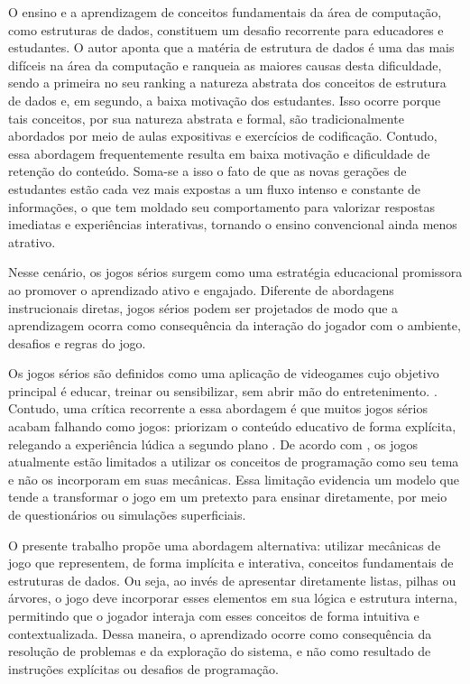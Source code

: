 O ensino e a aprendizagem de conceitos fundamentais da área de computação, como estruturas de dados, constituem um desafio recorrente para educadores e estudantes. O autor \cite{mtaho2024difficulties} aponta que a matéria de estrutura de dados é uma das mais difíceis na área da computação e ranqueia as maiores causas desta dificuldade, sendo a primeira no seu ranking a natureza abstrata dos conceitos de estrutura de dados e, em segundo, a baixa motivação dos estudantes. Isso ocorre porque tais conceitos, por sua natureza abstrata e formal, são tradicionalmente abordados por meio de aulas expositivas e exercícios de codificação. Contudo, essa abordagem frequentemente resulta em baixa motivação e dificuldade de retenção do conteúdo. Soma-se a isso o fato de que as novas gerações de estudantes estão cada vez mais expostas a um fluxo intenso e constante de informações, o que tem moldado seu comportamento para valorizar respostas imediatas e experiências interativas, tornando o ensino convencional ainda menos atrativo.

Nesse cenário, os jogos sérios surgem como uma estratégia educacional promissora ao promover o aprendizado ativo e engajado. Diferente de abordagens instrucionais diretas, jogos sérios podem ser projetados de modo que a aprendizagem ocorra como consequência da interação do jogador com o ambiente, desafios e regras do jogo. 

Os jogos sérios são definidos como uma aplicação de videogames cujo objetivo principal é educar, treinar ou sensibilizar, sem abrir mão do entretenimento. \cite{mouaheb2012serious}. Contudo, uma crítica recorrente a essa abordagem é que muitos jogos sérios acabam falhando como jogos: priorizam o conteúdo educativo de forma explícita, relegando a experiência lúdica a segundo plano . De acordo com \cite{de2025codebo}, os jogos atualmente estão limitados a utilizar os conceitos de programação como seu tema e não os incorporam em suas mecânicas. Essa limitação evidencia um modelo que tende a transformar o jogo em um pretexto para ensinar diretamente, por meio de questionários ou simulações superficiais.

O presente trabalho propõe uma abordagem alternativa: utilizar mecânicas de jogo que representem, de forma implícita e interativa, conceitos fundamentais de estruturas de dados. Ou seja, ao invés de apresentar diretamente listas, pilhas ou árvores, o jogo deve incorporar esses elementos em sua lógica e estrutura interna, permitindo que o jogador interaja com esses conceitos de forma intuitiva e contextualizada. Dessa maneira, o aprendizado ocorre como consequência da resolução de problemas e da exploração do sistema, e não como resultado de instruções explícitas ou desafios de programação.

